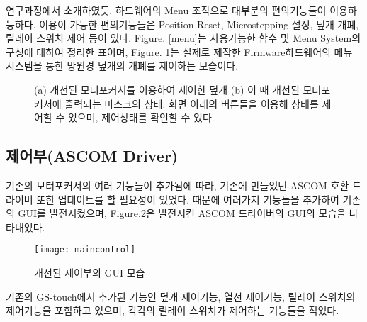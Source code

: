 연구과정에서 소개하였듯, 하드웨어의 Menu 조작으로 대부분의 편의기능들이 이용하능하다. 이용이 가능한 편의기능들은 Position Reset, Microstepping 설정, 덮개 개폐, 릴레이 스위치 제어 등이 있다. \textrm{Figure}. \ref{menu}는 사용가능한 함수 및 Menu System의 구성에 대하여 정리한 표이며, \textrm{Figure}. \ref{mask_status}는 실제로 제작한 Firmware하드웨어의 메뉴 시스템을 통한 망원경 덮개의 개폐를 제어하는 모습이다.

	\begin{figure}[ht]
	\begin{center}
	\end{center}
	\caption{(a) 개선된 모터포커서를 이용하여 제어한 덮개 (b) 이 때 개선된 모터포커서에 출력되는 마스크의 상태. 화면 아래의 버튼들을 이용해 상태를 제어할 수 있으며, 제어상태를 확인할 수 있다.}
	\label{mask_status}
\end{figure}
 
\newpage

\subsection{제어부(ASCOM Driver)}


 기존의 모터포커서의 여러 기능들이 추가됨에 따라, 기존에 만들었던 ASCOM 호환 드라이버 또한 업데이트를 할 필요성이 있었다. 때문에 여러가지 기능들을 추가하여 기존의 GUI를 발전시켰으며, \textrm{Figure}.\ref{maincontrol}은 발전시킨 ASCOM 드라이버의 GUI의 모습을 나타내었다.
 
 \begin{figure}[h]
	\begin{center}
		\texttt{[image: maincontrol]}
	\end{center}
	\caption{개선된 제어부의 GUI 모습}
	\label{maincontrol}
\end{figure}

 기존의 GS-touch에서 추가된 기능인 덮개 제어기능, 열선 제어기능, 릴레이 스위치의 제어기능을 포함하고 있으며, 각각의 릴레이 스위치가 제어하는 기능들을 적었다.
